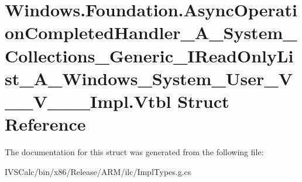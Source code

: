 \hypertarget{struct_windows_1_1_foundation_1_1_async_operation_completed_handler___a___system___collections__fb350a38c12d04e67d4fc9eb8e3f785b}{}\section{Windows.\+Foundation.\+Async\+Operation\+Completed\+Handler\+\_\+\+A\+\_\+\+System\+\_\+\+Collections\+\_\+\+Generic\+\_\+\+I\+Read\+Only\+List\+\_\+\+A\+\_\+\+Windows\+\_\+\+System\+\_\+\+User\+\_\+\+V\+\_\+\+\_\+\+V\+\_\+\+\_\+\+\_\+\+Impl.\+Vtbl Struct Reference}
\label{struct_windows_1_1_foundation_1_1_async_operation_completed_handler___a___system___collections__fb350a38c12d04e67d4fc9eb8e3f785b}


The documentation for this struct was generated from the following file\+:\begin{DoxyCompactItemize}
\item 
I\+V\+S\+Calc/bin/x86/\+Release/\+A\+R\+M/ilc/Impl\+Types.\+g.\+cs\end{DoxyCompactItemize}

